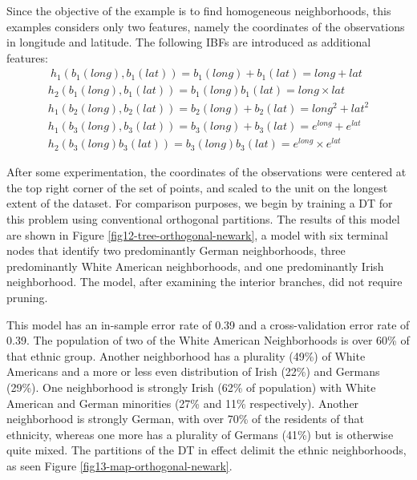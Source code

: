 \documentclass[]{elsarticle} %
\begin{document}
Since the objective of the example is to find homogeneous neighborhoods,
this examples considers only two features, namely the coordinates of the
observations in longitude and latitude. The following IBFs are
introduced as additional features: \[
\begin{array}{c}\
h_1(b_1(long),b_1(lat))=b_1(long)+b_1(lat)=long+lat\\
h_2(b_1(long),b_1(lat))=b_1(long)b_1(lat)=long\times lat\\
h_1(b_2(long),b_2(lat))=b_2(long)+b_2(lat)=long^2+lat^2\\
h_1(b_3(long),b_3(lat))=b_3(long)+b_3(lat)=e^{long}+e^{lat}\\
h_2(b_3(long)b_3(lat))=b_3(long)b_3(lat)=e^{long}\times e^{lat}
\end{array}
\]

After some experimentation, the coordinates of the observations were
centered at the top right corner of the set of points, and scaled to the
unit on the longest extent of the dataset. For comparison purposes, we
begin by training a DT for this problem using conventional orthogonal
partitions. The results of this model are shown in Figure
\ref{fig12-tree-orthogonal-newark}, a model with six terminal nodes that
identify two predominantly German neighborhoods, three predominantly
White American neighborhoods, and one predominantly Irish neighborhood.
The model, after examining the interior branches, did not require
pruning.

This model has an in-sample error rate of 0.39 and a cross-validation
error rate of 0.39. The population of two of the White American
Neighborhoods is over 60\% of that ethnic group. Another neighborhood
has a plurality (49\%) of White Americans and a more or less even
distribution of Irish (22\%) and Germans (29\%). One neighborhood is
strongly Irish (62\% of population) with White American and German
minorities (27\% and 11\% respectively). Another neighborhood is
strongly German, with over 70\% of the residents of that ethnicity,
whereas one more has a plurality of Germans (41\%) but is otherwise
quite mixed. The partitions of the DT in effect delimit the ethnic
neighborhoods, as seen Figure \ref{fig13-map-orthogonal-newark}.
\end{document}
